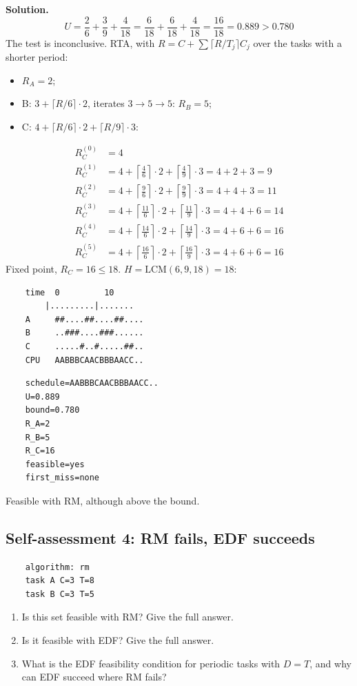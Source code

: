 \textbf{Solution.}
\[
U = \frac{2}{6} + \frac{3}{9} + \frac{4}{18} = \frac{6}{18} + \frac{6}{18} + \frac{4}{18} = \frac{16}{18} = 0.889 > 0.780
\]
The test is inconclusive. RTA, with $R = C + \sum \lceil R / T_j \rceil C_j$ over the tasks with a shorter period:
\begin{itemize}
    \item $R_A = 2$;
    \item B: $3 + \lceil R/6 \rceil \cdot 2$, iterates $3 \to 5 \to 5$: $R_B = 5$;
    \item C: $4 + \lceil R/6 \rceil \cdot 2 + \lceil R/9 \rceil \cdot 3$:
\end{itemize}
\[
\begin{aligned}
R_C^{(0)} &= 4 \\
R_C^{(1)} &= 4 + \left\lceil \tfrac{4}{6} \right\rceil \cdot 2 + \left\lceil \tfrac{4}{9} \right\rceil \cdot 3 = 4 + 2 + 3 = 9 \\
R_C^{(2)} &= 4 + \left\lceil \tfrac{9}{6} \right\rceil \cdot 2 + \left\lceil \tfrac{9}{9} \right\rceil \cdot 3 = 4 + 4 + 3 = 11 \\
R_C^{(3)} &= 4 + \left\lceil \tfrac{11}{6} \right\rceil \cdot 2 + \left\lceil \tfrac{11}{9} \right\rceil \cdot 3 = 4 + 4 + 6 = 14 \\
R_C^{(4)} &= 4 + \left\lceil \tfrac{14}{6} \right\rceil \cdot 2 + \left\lceil \tfrac{14}{9} \right\rceil \cdot 3 = 4 + 6 + 6 = 16 \\
R_C^{(5)} &= 4 + \left\lceil \tfrac{16}{6} \right\rceil \cdot 2 + \left\lceil \tfrac{16}{9} \right\rceil \cdot 3 = 4 + 6 + 6 = 16
\end{aligned}
\]
Fixed point, $R_C = 16 \le 18$. $H = \mathrm{LCM}(6, 9, 18) = 18$:
\begin{verbatim}
    time  0         10
        |.........|.......
    A     ##....##....##....
    B     ..###....###......
    C     .....#..#.....##..
    CPU   AABBBCAACBBBAACC..
\end{verbatim}
\begin{verbatim}
    schedule=AABBBCAACBBBAACC..
    U=0.889
    bound=0.780
    R_A=2
    R_B=5
    R_C=16
    feasible=yes
    first_miss=none
\end{verbatim}
Feasible with RM, although above the bound.

\subsection*{Self-assessment 4: RM fails, EDF succeeds}
\begin{lstlisting}
    algorithm: rm
    task A C=3 T=8
    task B C=3 T=5
\end{lstlisting}
\begin{enumerate}
    \item Is this set feasible with RM? Give the full answer.
    \item Is it feasible with EDF? Give the full answer.
    \item What is the EDF feasibility condition for periodic tasks with $D = T$, and why can EDF succeed where RM fails?
\end{enumerate}

